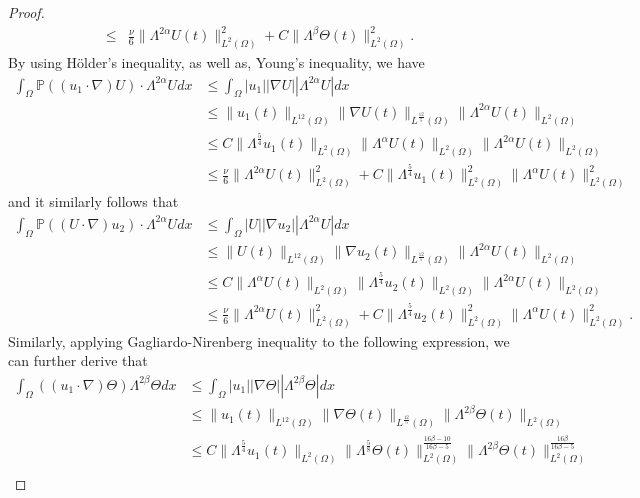 \documentclass[oneside,preprint,12pt,numbers,sort&compress]{elsarticle}
\begin{document}
\begin{proof}
\begin{align*}
\leq &
\frac{\nu}{6} \| \Lambda^{2\alpha} U(t) \|_{L^2(\Omega)}^{2} + C \|\Lambda^{\beta} \Theta(t) \|_{L^2(\Omega)}^{2}.
\end{align*}
By using H\"{o}lder’s inequality, as well as, Young’s inequality, we have  
\begin{align*}
\int_{\Omega} \mathbb{P} \left( (u_1 \cdot \nabla) U \right) \cdot \Lambda^{2\alpha}U dx
   & \leq \int_{\Omega}  |u_1| |\nabla U | |\Lambda^{2\alpha}U| dx \\
   & \leq \| u_1(t) \|_{L^{12}(\Omega)} \| \nabla U(t) \|_{L^{\frac{12}{5}}(\Omega)} \|\Lambda^{2\alpha} U(t) \|_{L^2(\Omega)} \\
   & \leq C\| \Lambda^{\frac{5}{4}}u_{1}(t) \|_{L^{2}(\Omega)} \| \Lambda^{\alpha}U(t) \|_{L^2(\Omega)} \|\Lambda^{2\alpha} U(t) \|_{L^2(\Omega)} \\
   & \leq \frac{\nu}{6} \| \Lambda^{2\alpha}U (t) \|_{L^{2}(\Omega)}^{2} + C \| \Lambda^{\frac{5}{4}} u_1(t) \|_{L^2(\Omega)}^{2} \| \Lambda^{\alpha}U(t) \|_{L^2(\Omega)}^{2}
\end{align*}
and it similarly follows that
\begin{align*}
  \int_{\Omega} \mathbb{P} \left( (U \cdot \nabla) u_2 \right) \cdot \Lambda^{2\alpha}U dx
   & \leq \int_{\Omega}  |U| |\nabla u_2| |\Lambda^{2\alpha}U| dx \\
   & \leq \| U(t) \|_{L^{12}(\Omega)} \| \nabla u_2(t) \|_{L^{\frac{12}{5}}(\Omega)} \|\Lambda^{2\alpha} U(t) \|_{L^2(\Omega)} \\
   & \leq C\| \Lambda^{\alpha}U(t) \|_{L^{2}(\Omega)} \| \Lambda^{\frac{5}{4}} u_2 (t) \|_{L^2(\Omega)} \|\Lambda^{2\alpha} U(t) \|_{L^2(\Omega)} \\
   & \leq \frac{\nu}{6} \| \Lambda^{2\alpha}U (t) \|_{L^{2}(\Omega)}^{2} + C \| \Lambda^{\frac{5}{4}} u_2(t) \|_{L^2(\Omega)}^{2} \| \Lambda^{\alpha}U(t) \|_{L^2(\Omega)}^{2}.
\end{align*}
Similarly, applying Gagliardo-Nirenberg inequality to the following expression, we can further derive that
\begin{align*}
  \int_{\Omega} \left( (u_1 \cdot \nabla) \Theta \right) \Lambda^{2\beta}\Theta dx
   & \leq \int_{\Omega}  |u_1| |\nabla\Theta| |\Lambda^{2\beta}\Theta| dx \\
   & \leq \| u_1(t) \|_{L^{12}(\Omega)} \| \nabla\Theta(t) \|_{L^{\frac{12}{5}}(\Omega)} \|\Lambda^{2\beta}\Theta(t) \|_{L^2(\Omega)} \\
   & \leq C \| \Lambda^{\frac{5}{4}} u_1 (t) \|_{L^2(\Omega)}
   \|\Lambda^{\frac{5}{8}}\Theta(t) \|_{L^2(\Omega)}^{\frac{16\beta-10}{16\beta-5}} \|\Lambda^{2\beta}\Theta(t) \|_{L^2(\Omega)}^{\frac{16\beta}{16\beta-5}}  \\

\end{align*}
\end{proof}
\end{document}
